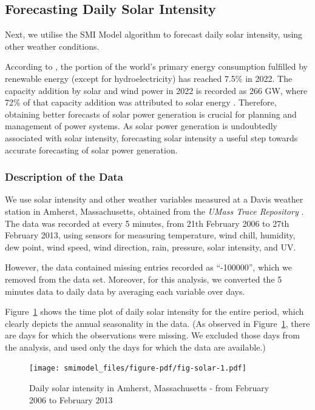 \documentclass[11pt,a4paper,]{article}
\begin{document}
\hypertarget{forecasting-daily-solar-intensity}{%
\subsection{Forecasting Daily Solar
Intensity}\label{forecasting-daily-solar-intensity}}

Next, we utilise the SMI Model algorithm to forecast daily solar
intensity, using other weather conditions.

According to \textcite{EI2023}, the portion of the world's primary
energy consumption fulfilled by renewable energy (except for
hydroelectricity) has reached 7.5\% in 2022. The capacity addition by
solar and wind power in 2022 is recorded as 266 GW, where 72\% of that
capacity addition was attributed to solar energy \autocite{EI2023}.
Therefore, obtaining better forecasts of solar power generation is
crucial for planning and management of power systems. As solar power
generation is undoubtedly associated with solar intensity, forecasting
solar intensity a useful step towards accurate forecasting of solar
power generation.

\hypertarget{description-of-the-data-1}{%
\subsubsection{Description of the
Data}\label{description-of-the-data-1}}

We use solar intensity and other weather variables measured at a Davis
weather station in Amherst, Massachusetts, obtained from the \emph{UMass
Trace Repository} \autocite{Umass2023}. The data was recorded at every 5
minutes, from 21th February 2006 to 27th February 2013, using sensors
for measuring temperature, wind chill, humidity, dew point, wind speed,
wind direction, rain, pressure, solar intensity, and UV.

However, the data contained missing entries recorded as ``-100000'',
which we removed from the data set. Moreover, for this analysis, we
converted the 5 minutes data to daily data by averaging each variable
over days.

Figure~\ref{fig-solar} shows the time plot of daily solar intensity for
the entire period, which clearly depicts the annual seasonality in the
data. (As observed in Figure~\ref{fig-solar}, there are days for which
the observations were missing. We excluded those days from the analysis,
and used only the days for which the data are available.)

\begin{figure}

{\centering \texttt{[image: smimodel\_files/figure-pdf/fig-solar-1.pdf]}

}

\caption{\label{fig-solar}Daily solar intensity in Amherst,
Massachusetts - from February 2006 to February 2013}

\end{figure}
\end{document}
